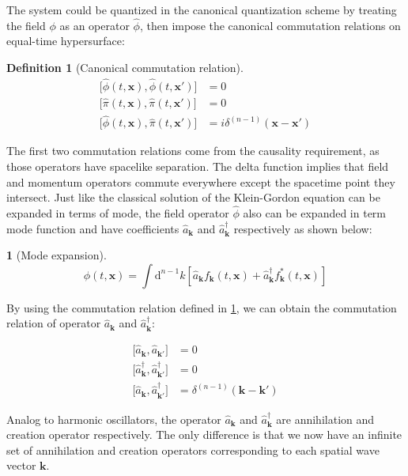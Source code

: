 \documentclass[12pt]{article}
\numberwithin{equation}{section}
\theoremstyle{1style}
\newtheorem{definition}[equation]{Definition}
\newtheorem{cthm}[equation]{}
\newcommand{\id}{\mathrm{d}}
\begin{document}
The system could be quantized in the canonical quantization scheme by treating the field \(\phi\) as an operator \(\hat{\phi}\),
then impose the canonical commutation relations on equal-time hypersurface:
\begin{definition}[Canonical commutation relation]\label{121}
  \begin{align*}
    \bigl[\hat{\phi}(t,\mathbf{x}),\hat{\phi}(t,\mathbf{x'})\bigr] & =0                                       \\
    \bigl[\hat{\pi}(t,\mathbf{x}),\hat{\pi}(t,\mathbf{x'})\bigr]   & =0                                       \\
    \bigl[\hat{\phi}(t,\mathbf{x}),\hat{\pi}(t,\mathbf{x'})\bigr]  & =i\delta^{(n-1)}(\mathbf{x}-\mathbf{x'})
  \end{align*}
\end{definition}
The first two commutation relations come from the causality requirement, as those operators have spacelike separation.
The delta function implies that field and momentum operators commute everywhere except the spacetime point they intersect.
Just like the classical solution of the Klein-Gordon equation can be expanded in terms of mode,
the field operator \(\hat{\phi}\) also can be expanded in term mode function and have coefficients \(\hat{a}_{\mathbf{k}}\) and
\(\hat{a}^{\dagger}_{\mathbf{k}}\) respectively as shown below:
\begin{cthm}[Mode expansion]
  \[\phi(t,\mathbf{x})=\int\id^{n-1}k\left[\hat{a}_{\mathbf{k}}f_{\mathbf{k}}(t,\mathbf{x})+
    \hat{a}^{\dagger}_{\mathbf{k}}f^*_{\mathbf{k}}(t,\mathbf{x})\right]\]
\end{cthm}
By using the commutation relation defined in \ref{121}, we can obtain the commutation relation of operator \(\hat{a}_{\mathbf{k}}\) and
\(\hat{a}^{\dagger}_{\mathbf{k}}\):


\begin{align}
  \bigl[\hat{a}_{\mathbf{k}},\hat{a}_{\mathbf{k'}}\bigr]                     & =0                                      \\
  \bigl[\hat{a}^{\dagger}_{\mathbf{k}},\hat{a}^{\dagger}_{\mathbf{k'}}\bigr] & =0                                      \\
  \bigl[\hat{a}_{\mathbf{k}},\hat{a}^{\dagger}_{\mathbf{k'}}\bigr]           & =\delta^{(n-1)}(\mathbf{k}-\mathbf{k'})
\end{align}


Analog to harmonic oscillators, the operator \(\hat{a}_{\mathbf{k}}\) and
\(\hat{a}^{\dagger}_{\mathbf{k}}\) are annihilation and creation operator respectively.
The only difference is that we now have an infinite set of annihilation and creation operators corresponding to each spatial wave vector \(\mathbf{k}\).
\end{document}

